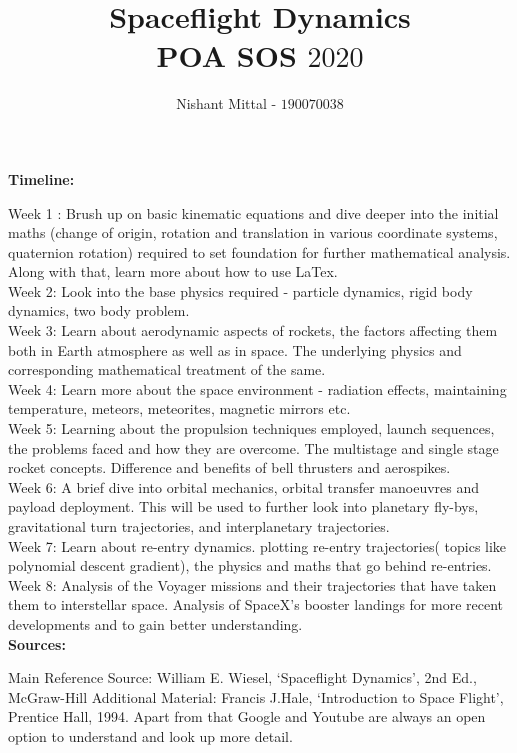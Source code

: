 \documentclass[12pt, letterpaper]{article}
\title{\textbf{Spaceflight Dynamics}\\ 
 		\large{POA	SOS $2020$}}
\author{Nishant Mittal - $190070038$}
\begin{document}
\maketitle

\noindent
\textbf{Timeline:}

\noindent
Week 1 : Brush up on basic kinematic equations and dive deeper into the initial maths (change of origin, rotation and translation in various coordinate systems, quaternion rotation) required to set foundation for further mathematical analysis. Along with that, learn more about how to use LaTex.\\

\noindent
Week 2: Look into the base physics required - particle dynamics, rigid body dynamics, two body problem.\\

\noindent
Week 3: Learn about aerodynamic aspects of rockets, the factors affecting them both in Earth atmosphere as well as in space. The underlying physics and corresponding mathematical treatment of the same.\\

\noindent
Week 4: Learn more about the space environment - radiation effects, maintaining temperature, meteors, meteorites, magnetic mirrors etc.\\

\noindent
Week 5: Learning about the propulsion techniques employed, launch sequences, the problems faced and how they are overcome. The multistage and single stage rocket concepts. Difference and benefits of bell thrusters and aerospikes.\\

\noindent
Week 6: A brief dive into orbital mechanics, orbital transfer manoeuvres and payload deployment. This will be used to further look into planetary fly-bys, gravitational turn trajectories, and interplanetary trajectories.\\

\noindent
Week 7: Learn about re-entry dynamics. plotting re-entry trajectories( topics like polynomial descent gradient), the physics and maths that go behind re-entries. \\

\noindent
Week 8: Analysis of the Voyager missions and their trajectories that have taken them to interstellar space. Analysis of SpaceX’s booster landings for more recent developments and to gain better understanding.\\

\noindent
\textbf{Sources:}

\noindent
Main Reference Source: William E. Wiesel, ‘Spaceflight Dynamics’, 2nd Ed., McGraw-Hill
Additional Material: Francis J.Hale, ‘Introduction to Space Flight’, Prentice Hall, 1994.
Apart from that Google and Youtube are always an open option to understand and look up more detail.
\end{document}
